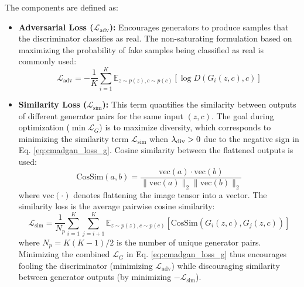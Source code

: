 The components are defined as:
\begin{itemize}
    \item \textbf{Adversarial Loss (\( \mathcal{L}_{\text{adv}} \)):} Encourages generators to produce samples that the discriminator classifies as real. The non-saturating formulation based on maximizing the probability of fake samples being classified as real is commonly used:
    \begin{equation}
    \label{eq:cmadgan_loss_g_adv}
    \mathcal{L}_{\text{adv}} = - \frac{1}{K} \sum_{i=1}^{K} \mathbb{E}_{z \sim p(z), c \sim p(c)} [\log D(G_i(z, c), c)]
    \end{equation}

    \item \textbf{Similarity Loss (\( \mathcal{L}_{\text{sim}} \)):} This term quantifies the similarity between outputs of different generator pairs for the same input \( (z, c) \). The goal during optimization (\(\min \mathcal{L}_G\)) is to maximize diversity, which corresponds to minimizing the similarity term \( \mathcal{L}_{\text{sim}} \) when \( \lambda_{\text{div}} > 0 \) due to the negative sign in Eq. \ref{eq:cmadgan_loss_g}. Cosine similarity between the flattened outputs is used:
    \begin{equation}
    \label{eq:cmadgan_cossim}
    \text{CosSim}(a, b) = \frac{\text{vec}(a) \cdot \text{vec}(b)}{\|\text{vec}(a)\|_2 \|\text{vec}(b)\|_2} 
    \end{equation}
    where \( \text{vec}(\cdot) \) denotes flattening the image tensor into a vector. The similarity loss is the average pairwise cosine similarity:
    \begin{equation}
    \label{eq:cmadgan_loss_g_sim}
    \mathcal{L}_{\text{sim}} = \frac{1}{N_p} \sum_{i=1}^{K} \sum_{j=i+1}^{K} \mathbb{E}_{z \sim p(z), c \sim p(c)} [\text{CosSim}(G_i(z, c), G_j(z, c))]
    \end{equation}
    where \( N_p = K(K-1)/2 \) is the number of unique generator pairs. Minimizing the combined \( \mathcal{L}_G \) in Eq. \ref{eq:cmadgan_loss_g} thus encourages fooling the discriminator (minimizing \( \mathcal{L}_{\text{adv}} \)) while discouraging similarity between generator outputs (by minimizing \( -\mathcal{L}_{\text{sim}} \)).
\end{itemize}


